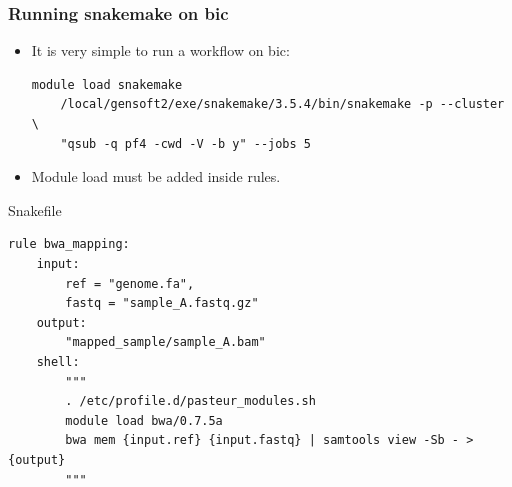 \documentclass{beamer}
\begin{document}
\begin{frame}[fragile]
    \frametitle{Running snakemake on bic}
    \begin{itemize}
        \item It is very simple to run a workflow on bic:
            \begin{lstlisting}[language={}]
    module load snakemake
    /local/gensoft2/exe/snakemake/3.5.4/bin/snakemake -p --cluster \
    "qsub -q pf4 -cwd -V -b y" --jobs 5
            \end{lstlisting}
        \item Module load must be added inside rules.
    \end{itemize}
    \begin{block}{Snakefile}
        \begin{lstlisting}
rule bwa_mapping:
    input:
        ref = "genome.fa",
        fastq = "sample_A.fastq.gz"
    output:
        "mapped_sample/sample_A.bam"
    shell:
        """
        . /etc/profile.d/pasteur_modules.sh
        module load bwa/0.7.5a
        bwa mem {input.ref} {input.fastq} | samtools view -Sb - > {output}
        """
        \end{lstlisting}
    \end{block}
\end{frame}
\end{document}
